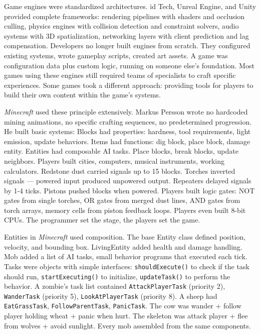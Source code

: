 Game engines were standardized architectures. id Tech, Unreal Engine, and Unity provided complete frameworks: rendering pipelines with shaders and occlusion culling, physics engines with collision detection and constraint solvers, audio systems with 3D spatialization, networking layers with client prediction and lag compensation. Developers no longer built engines from scratch. They configured existing systems, wrote gameplay scripts, created art assets.  A game was configuration data plus custom logic, running on someone else's foundation. Most games using these engines still required teams of specialists to craft specific experiences. Some games took a different approach: providing tools for players to build their own content within the game's systems.

\emph{Minecraft} used these principle extensively. Markus Persson wrote no hardcoded mining animations, no specific crafting sequences, no predetermined progression. He built basic systems: Blocks had properties: hardness, tool requirements, light emission, update behaviors. Items had functions: dig block, place block, damage entity. Entities had composable AI tasks.  Place blocks, break blocks, update neighbors. Players built cities, computers, musical instruments, working calculators. Redstone dust carried signals up to 15 blocks. Torches inverted signals — powered input produced unpowered output. Repeaters delayed signals by 1-4 ticks. Pistons pushed blocks when powered. Players built logic gates: NOT gates from single torches, OR gates from merged dust lines, AND gates from torch arrays, memory cells from piston feedback loops.  Players even built 8-bit CPUs. The programmer set the stage, the players set the game.

Entities in \emph{Minecraft} used composition. The base Entity class defined position, velocity, and bounding box. LivingEntity added health and damage handling. Mob added a list of AI tasks, small behavior programs that executed each tick. Tasks were objects with simple interfaces: \texttt{shouldExecute()} to check if the task should run, \texttt{startExecuting()} to initialize, \texttt{updateTask()} to perform the behavior. A zombie's task list contained \texttt{AttackPlayerTask} (priority 2), \texttt{WanderTask} (priority 5), \texttt{LookAtPlayerTask} (priority 8). A sheep had \texttt{EatGrassTask}, \texttt{FollowParentTask}, \texttt{PanicTask}.  The cow was wander + follow player holding wheat + panic when hurt. The skeleton was attack player + flee from wolves + avoid sunlight. Every mob assembled from the same components.

